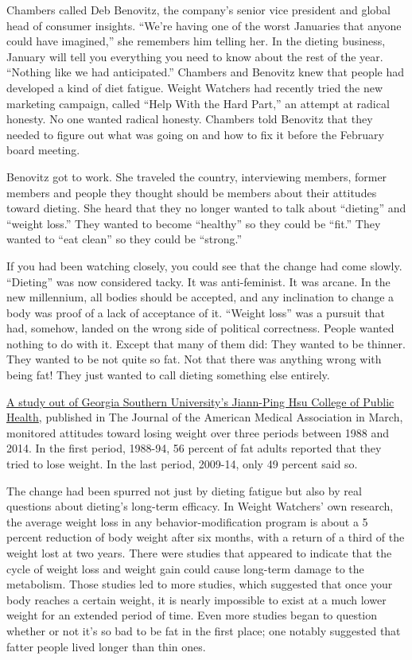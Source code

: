 Chambers called Deb Benovitz, the company's senior vice president and
global head of consumer insights. ``We're having one of the worst
Januaries that anyone could have imagined,'' she remembers him telling
her. In the dieting business, January will tell you everything you need
to know about the rest of the year. ``Nothing like we had anticipated.''
Chambers and Benovitz knew that people had developed a kind of diet
fatigue. Weight Watchers had recently tried the new marketing campaign,
called ``Help With the Hard Part,'' an attempt at radical honesty. No
one wanted radical honesty. Chambers told Benovitz that they needed to
figure out what was going on and how to fix it before the February board
meeting.

Benovitz got to work. She traveled the country, interviewing members,
former members and people they thought should be members about their
attitudes toward dieting. She heard that they no longer wanted to talk
about ``dieting'' and ``weight loss.'' They wanted to become ``healthy''
so they could be ``fit.'' They wanted to ``eat clean'' so they could be
``strong.''

If you had been watching closely, you could see that the change had come
slowly. ``Dieting'' was now considered tacky. It was anti-feminist. It
was arcane. In the new millennium, all bodies should be accepted, and
any inclination to change a body was proof of a lack of acceptance of
it. ``Weight loss'' was a pursuit that had, somehow, landed on the wrong
side of political correctness. People wanted nothing to do with it.
Except that many of them did: They wanted to be thinner. They wanted to
be not quite so fat. Not that there was anything wrong with being fat!
They just wanted to call dieting something else entirely.

\href{http://jamanetwork.com/journals/jama/article-abstract/2608211}{A
study out of Georgia Southern University's Jiann-Ping Hsu College of
Public Health}, published in The Journal of the American Medical
Association in March, monitored attitudes toward losing weight over
three periods between 1988 and 2014. In the first period, 1988-94, 56
percent of fat adults reported that they tried to lose weight. In the
last period, 2009-14, only 49 percent said so.

The change had been spurred not just by dieting fatigue but also by real
questions about dieting's long-term efficacy. In Weight Watchers' own
research, the average weight loss in any behavior-modification program
is about a 5 percent reduction of body weight after six months, with a
return of a third of the weight lost at two years. There were studies
that appeared to indicate that the cycle of weight loss and weight gain
could cause long-term damage to the metabolism. Those studies led to
more studies, which suggested that once your body reaches a certain
weight, it is nearly impossible to exist at a much lower weight for an
extended period of time. Even more studies began to question whether or
not it's so bad to be fat in the first place; one notably suggested that
fatter people lived longer than thin ones.

